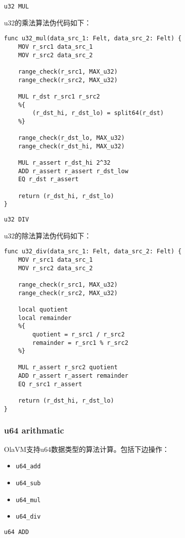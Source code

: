 \verb|u32 MUL|

u32的乘法算法伪代码如下：

\begin{lstlisting}[language={}]
func u32_mul(data_src_1: Felt, data_src_2: Felt) {
    MOV r_src1 data_src_1
    MOV r_src2 data_src_2

    range_check(r_src1, MAX_u32)
    range_check(r_src2, MAX_u32)

    MUL r_dst r_src1 r_src2
    %{
        (r_dst_hi, r_dst_lo) = split64(r_dst)
    %}

    range_check(r_dst_lo, MAX_u32)
    range_check(r_dst_hi, MAX_u32)

    MUL r_assert r_dst_hi 2^32
    ADD r_assert r_assert r_dst_low
    EQ r_dst r_assert

    return (r_dst_hi, r_dst_lo)
}
\end{lstlisting}


\verb|u32 DIV|

u32的除法算法伪代码如下：

\begin{lstlisting}[language={}]
func u32_div(data_src_1: Felt, data_src_2: Felt) {
    MOV r_src1 data_src_1
    MOV r_src2 data_src_2

    range_check(r_src1, MAX_u32)
    range_check(r_src2, MAX_u32)

    local quotient
    local remainder
    %{
        quotient = r_src1 / r_src2
        remainder = r_src1 % r_src2
    %}

    MUL r_assert r_src2 quotient
    ADD r_assert r_assert remainder
    EQ r_src1 r_assert

    return (r_dst_hi, r_dst_lo)
}
\end{lstlisting}

\subsubsection{u64 arithmatic}\label{subsec: u64-arithmatic}

OlaVM支持u64数据类型的算法计算。包括下边操作：
\begin{itemize}
    \item \verb|u64_add|
    \item \verb|u64_sub|
    \item \verb|u64_mul|
    \item \verb|u64_div|
\end{itemize}

\verb|u64 ADD|

